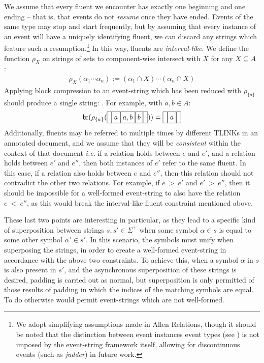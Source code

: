\documentclass[a4paper,11pt,leqno]{article}
\makeatletter
\newcommand{\bc}{{\rm b\!c}}
\newcommand{\vph}[1]{\vphantom{#1}}
\newcommand{\ebox}[1]{\fbox{$\vph{',}#1$}}
\newcommand{\eboxb}[1]{\fbox{$\vph{@}#1$}}
\makeatother
\begin{document}
We assume that every fluent we encounter has exactly one beginning and one 
ending -- that is, that events do not \textit{resume} once they have ended. 
Events of the same type may stop and start frequently, but by assuming that 
every instance of an event will have a uniquely identifying fluent, we can 
discard any strings which feature such a resumption.\footnote{We adopt 
simplifying assumptions made in Allen Relations, though it should be noted that 
the distinction between event instances event types (see 
\citealp{fernando2015semantics}) is not imposed by the 
event-string framework itself, allowing for discontinuous events (such as 
\textit{judder}) in future work.} In this way, fluents are 
\textit{interval-like}. We define the function 
$\rho_{X}$ on strings of sets to component-wise intersect with $X$ for 
any $X 
\subseteq A$ \citep{fernando2016prior}:
\begin{align}
\rho_{X}(\alpha_1 \cdots \alpha_n) := (\alpha_1 \cap X) \cdots 
(\alpha_n 
\cap 
X)
\end{align}
Applying block compression to an event-string which has been reduced with 
$\rho_{\{a\}}$ should produce a single string: \eboxb{}\eboxb{a}\eboxb{}. For 
example, with $a, b \in A$:
\begin{align}
\bc{}(\rho_{\{a\}}(\ebox{}\ebox{a}\ebox{a, b}\ebox{b}\ebox{})) = 
\ebox{}\ebox{a}\ebox{}
\end{align}
Additionally, fluents may be referred to multiple times by different TLINKs in 
an annotated document, and we assume that they will be \textit{consistent} 
within the context of that document \textit{i.e.} if a relation holds between 
$e$ and $e'$, and a relation holds between $e'$ and $e''$, then both instances 
of $e'$ refer to the same fluent. In this case, if a relation also holds 
between $e$ and $e''$, then this relation should not contradict the other two 
relations. For example, if $e~>~e'$ and $e'~>~e''$, then it should be 
impossible for a well-formed event-string to also have the relation $e~<~e''$, 
as this would break the interval-like fluent constraint mentioned above.

These last two points are interesting in particular, as they lead to a specific 
kind of superposition between strings $s, s' \in \Sigma^+$ when some 
symbol $\alpha \in s$ is equal to some other symbol $\alpha' \in s'$. In this 
scenario, the symbols must unify when superposing the strings, in order to 
create a well-formed event-string in accordance with the above two constraints. 
To achieve this, when a symbol $\alpha$ in $s$ is also present in $s'$, and the 
asynchronous superposition of these strings is desired, padding is carried out 
as normal, but superposition is only permitted of those results of padding 
in which the indices of the matching symbols are equal. To do otherwise would 
permit event-strings which are not well-formed.
\end{document}
